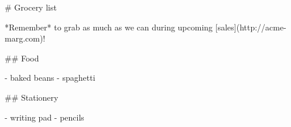 \documentclass{article}
\begin{document}
\begin{markdown}

# Grocery list

*Remember* to grab as much as we can during upcoming [sales](http://acme-marg.com)!

## Food

- baked beans
- spaghetti

## Stationery 

- writing pad
- pencils

\end{markdown}
\end{document}
